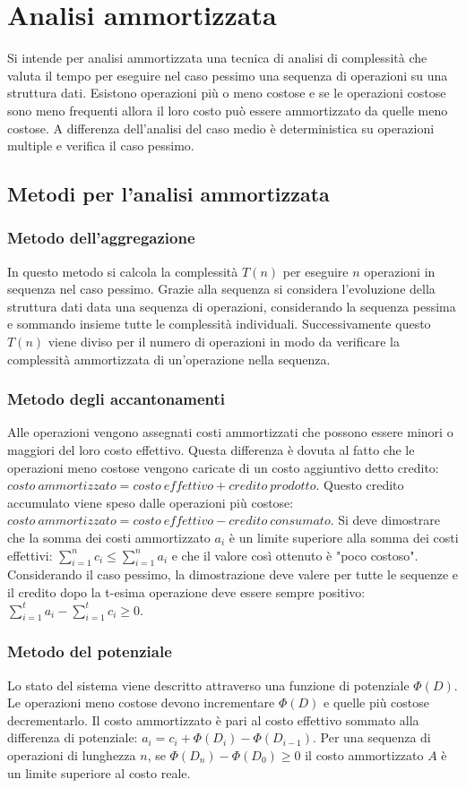 \section{Analisi ammortizzata}
Si intende per analisi ammortizzata una tecnica di analisi di complessit\`a che valuta il tempo per eseguire nel caso pessimo una sequenza di operazioni 
su una struttura dati. Esistono operazioni pi\`u o meno costose e se le operazioni costose sono meno frequenti allora il loro costo pu\`o essere 
ammortizzato da quelle meno costose. A differenza dell'analisi del caso medio \`e deterministica su operazioni multiple e verifica il caso pessimo.
\subsection{Metodi per l'analisi ammortizzata}
\subsubsection{Metodo dell'aggregazione}
In questo metodo si calcola la complessit\`a $T(n)$ per eseguire $n$ operazioni in sequenza nel caso pessimo. Grazie alla sequenza si considera l'evoluzione
della struttura dati data una sequenza di operazioni, considerando la sequenza pessima e sommando insieme tutte le complessit\`a individuali. 
Successivamente questo $T(n)$ viene diviso per il numero di operazioni in modo da verificare la complessit\`a ammortizzata di un'operazione nella sequenza.
\subsubsection{Metodo degli accantonamenti}
Alle operazioni vengono assegnati costi ammortizzati che possono essere minori o maggiori del loro costo effettivo. Questa differenza \`e dovuta al fatto
che le operazioni meno costose vengono caricate di un costo aggiuntivo detto credito: $costo\ ammortizzato=costo\ effettivo+credito\ prodotto$. Questo 
credito accumulato viene speso dalle operazioni pi\`u costose: $costo\ ammortizzato=costo\ effettivo-credito\ consumato$. Si deve dimostrare che la somma
dei costi ammortizzato $a_i$ \`e un limite superiore alla somma dei costi effettivi: $\sum\limits_{i=1}^nc_i\le\sum\limits_{i=1}^na_i$ e che il valore 
cos\`i ottenuto \`e "poco costoso". Considerando il caso pessimo, la dimostrazione deve valere per tutte le sequenze e il credito dopo la t-esima operazione
deve essere sempre positivo: $\sum\limits_{i=1}^ta_i-\sum\limits_{i=1}^tc_i\ge 0$.
\subsubsection{Metodo del potenziale}
Lo stato del sistema viene descritto attraverso una funzione di potenziale $\Phi(D)$. Le operazioni meno costose devono incrementare $\Phi(D)$ e quelle
pi\`u costose decrementarlo. Il costo ammortizzato \`e pari al costo effettivo sommato alla differenza di potenziale: $a_i=c_i+\Phi(D_i)-\Phi(D_{i-1})$.
Per una sequenza di operazioni di lunghezza $n$, se $\Phi(D_n)-\Phi(D_0)\ge 0$ il costo ammortizzato $A$ \`e un limite superiore al costo reale.

